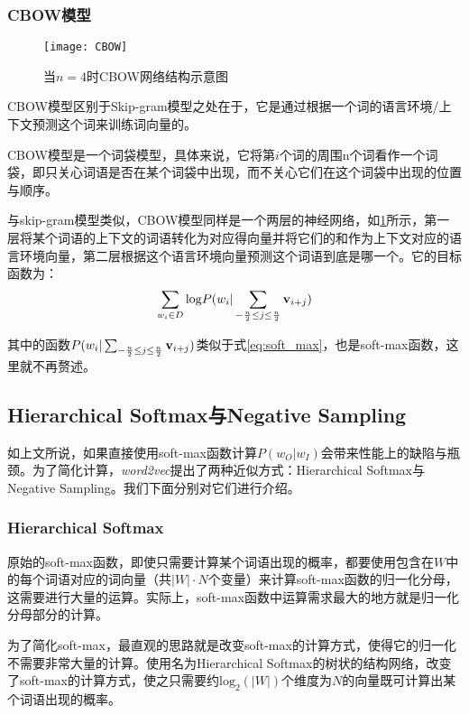 \subsubsection{CBOW模型}

\begin{figure}
\centering
\texttt{[image: CBOW]}
\caption{当$n=4$时CBOW网络结构示意图}
\label{fig:CBOW}
\end{figure}

CBOW模型区别于Skip-gram模型之处在于，它是通过根据一个词的语言环境/上下文预测这个词来训练词向量的。

CBOW模型是一个词袋模型，具体来说，它将第$i$个词的周围n个词看作一个词袋，即只关心词语是否在某个词袋中出现，而不关心它们在这个词袋中出现的位置与顺序。

与skip-gram模型类似，CBOW模型同样是一个两层的神经网络，如\ref{fig:CBOW}所示，第一层将某个词语的上下文的词语转化为对应得向量并将它们的和作为上下文对应的语言环境向量，第二层根据这个语言环境向量预测这个词语到底是哪一个。它的目标函数为：
\begin{eqnarray*}
\sum_{w_i \in D} \mathrm{log}P(w_{i} | \sum_{-\frac{n}{2}\leq j \leq \frac{n}{2}} {{\mathbf v}}_{i+j})
\end{eqnarray*}

其中的函数$P(w_{i} | \sum_{-\frac{n}{2}\leq j \leq \frac{n}{2}} {{\mathbf v}}_{i+j})$类似于式\ref{eq:soft_max}，也是soft-max函数，这里就不再赘述。

\subsection{Hierarchical Softmax与Negative Sampling}

如上文所说，如果直接使用soft-max函数计算$P(w_O | w_I)$会带来性能上的缺陷与瓶颈。为了简化计算，\emph{word2vec}提出了两种近似方式：Hierarchical Softmax与Negative Sampling。我们下面分别对它们进行介绍。

\subsubsection{Hierarchical Softmax}
\label{subsubsec:HS}

原始的soft-max函数，即使只需要计算某个词语出现的概率，都要使用包含在$W$中的每个词语对应的词向量（共$|W|\cdot N$个变量）来计算soft-max函数的归一化分母，这需要进行大量的运算。实际上，soft-max函数中运算需求最大的地方就是归一化分母部分的计算。

为了简化soft-max，最直观的思路就是改变soft-max的计算方式，使得它的归一化不需要非常大量的计算。\cite{morin2005hierarchical}使用名为Hierarchical Softmax的树状的结构网络，改变了soft-max的计算方式，使之只需要约$\mathrm{log}_2(|W|)$个维度为$N$的向量既可计算出某个词语出现的概率。

